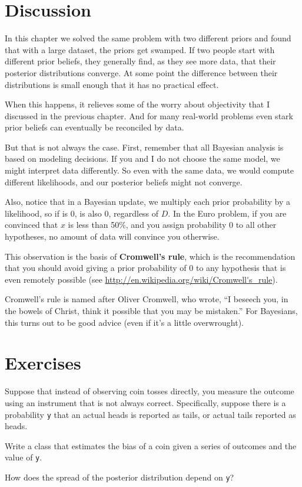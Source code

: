 \documentclass[12pt]{book}
\begin{document}
\section{Discussion}

In this chapter we solved the same problem with two different 
priors and found that with a large dataset, the priors get
swamped.  If two people start with different
prior beliefs, they generally find, as they see more data, that
their posterior distributions converge.  At some point the
difference between their distributions is small enough that it has
no practical effect.

When this happens, it relieves some of the worry about objectivity
that I discussed in the previous chapter.  And for many real-world
problems even stark prior beliefs can eventually be reconciled
by data.

But that is not always the case.  First, remember that all Bayesian
analysis is based on modeling decisions.  If you and I do not
choose the same model, we might interpret data differently.  So
even with the same data, we would compute different likelihoods,
and our posterior beliefs might not converge.

Also, notice that in a Bayesian update, we multiply
each prior probability by a likelihood, so if  is 0,
 is also 0, regardless of $D$.  In the Euro problem,
if you are convinced that $x$ is less than 50\%, and you assign
probability 0 to all other hypotheses, no amount of data will
convince you otherwise.

This observation is the basis of {\bf Cromwell's rule}, which is the
recommendation that you should avoid giving a prior probability of
0 to any hypothesis that is even remotely possible
(see \url{http://en.wikipedia.org/wiki/Cromwell's_rule}).

Cromwell's rule is named after Oliver Cromwell, who wrote, ``I beseech
you, in the bowels of Christ, think it possible that you may be
mistaken.''  For Bayesians, this turns out to be good advice (even if
it's a little overwrought).


\section{Exercises}

\begin{exercise}

Suppose that instead of observing coin tosses directly, you measure
the outcome using an instrument that is not always correct.  Specifically,
suppose there is a probability {\tt y} that an actual heads is reported
as tails, or actual tails reported as heads.

Write a class that estimates the bias of a coin given a series of
outcomes and the value of {\tt y}.

How does the spread of the posterior distribution depend on
{\tt y}?

\end{exercise}
\end{document}
